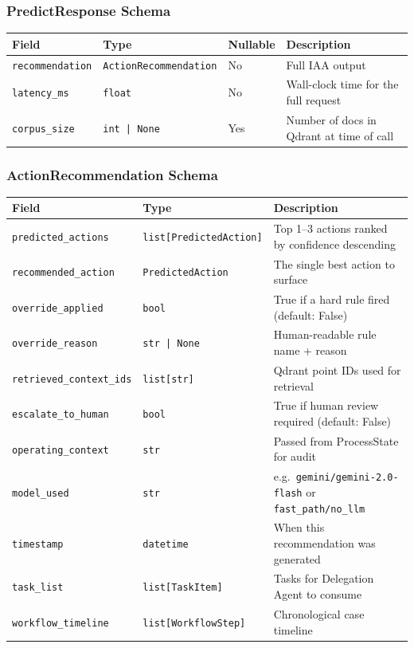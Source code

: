 \documentclass[12pt,a4paper]{article}
\begin{document}
\subsubsection{PredictResponse Schema}

\begin{center}
\begin{tabular}{@{}llll@{}}
\toprule
\textbf{Field} & \textbf{Type} & \textbf{Nullable} & \textbf{Description} \\
\midrule
\texttt{recommendation} & \texttt{ActionRecommendation} & No & Full IAA output \\
\texttt{latency\_ms} & \texttt{float} & No & Wall-clock time for the full request \\
\texttt{corpus\_size} & \texttt{int | None} & Yes & Number of docs in Qdrant at time of call \\
\bottomrule
\end{tabular}
\end{center}

\subsubsection{ActionRecommendation Schema}

\begin{longtable}{@{}p{4.2cm}p{3.5cm}p{6cm}@{}}
\toprule
\textbf{Field} & \textbf{Type} & \textbf{Description} \\
\midrule
\endhead
\texttt{predicted\_actions} & \texttt{list[PredictedAction]} & Top 1--3 actions ranked by confidence descending \\
\texttt{recommended\_action} & \texttt{PredictedAction} & The single best action to surface \\
\texttt{override\_applied} & \texttt{bool} & True if a hard rule fired (default: False) \\
\texttt{override\_reason} & \texttt{str | None} & Human-readable rule name + reason \\
\texttt{retrieved\_context\_ids} & \texttt{list[str]} & Qdrant point IDs used for retrieval \\
\texttt{escalate\_to\_human} & \texttt{bool} & True if human review required (default: False) \\
\texttt{operating\_context} & \texttt{str} & Passed from ProcessState for audit \\
\texttt{model\_used} & \texttt{str} & e.g.\ \texttt{gemini/gemini-2.0-flash} or \texttt{fast\_path/no\_llm} \\
\texttt{timestamp} & \texttt{datetime} & When this recommendation was generated \\
\texttt{task\_list} & \texttt{list[TaskItem]} & Tasks for Delegation Agent to consume \\
\texttt{workflow\_timeline} & \texttt{list[WorkflowStep]} & Chronological case timeline \\
\bottomrule
\end{longtable}
\end{document}
